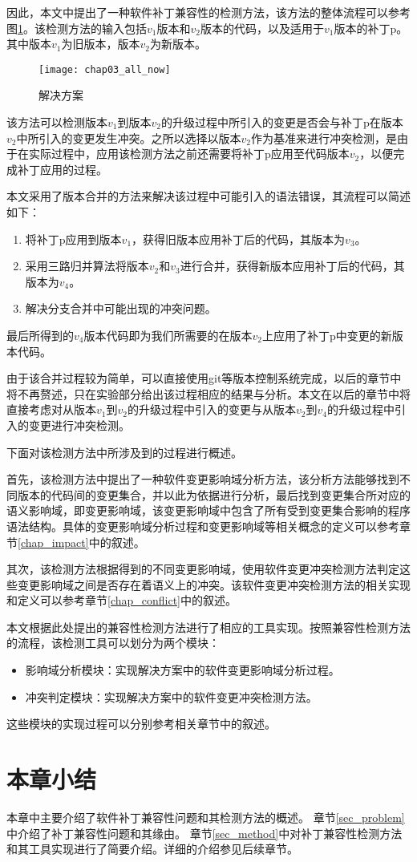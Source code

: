 因此，本文中提出了一种软件补丁兼容性的检测方法，该方法的整体流程可以参考图\ref {all_flow}。该检测方法的输入包括$v_1$版本和$v_2$版本的代码，以及适用于$v_1$版本的补丁p。其中版本$v_1$为旧版本，版本$v_2$为新版本。

\begin{figure}[H]
	\centering
	\texttt{[image: chap03\_all\_now]}
	\caption {解决方案}
	\label {all_flow}	
\end{figure}

该方法可以检测版本$v_1$到版本$v_2$的升级过程中所引入的变更是否会与补丁p在版本$v_2$中所引入的变更发生冲突。之所以选择以版本$v_2$作为基准来进行冲突检测，是由于在实际过程中，应用该检测方法之前还需要将补丁p应用至代码版本$v_2$，以便完成补丁应用的过程。

本文采用了版本合并的方法来解决该过程中可能引入的语法错误，其流程可以简述如下：
\begin{enumerate}
	\item 将补丁p应用到版本$v_1$，获得旧版本应用补丁后的代码，其版本为$v_3$。
	\item 采用三路归并算法将版本$v_2$和$v_3$进行合并，获得新版本应用补丁后的代码，其版本为$v_4$。
	\item 解决分支合并中可能出现的冲突问题。
\end{enumerate}

最后所得到的$v_4$版本代码即为我们所需要的在版本$v_2$上应用了补丁p中变更的新版本代码。

由于该合并过程较为简单，可以直接使用git等版本控制系统完成，以后的章节中将不再赘述，只在实验部分给出该过程相应的结果与分析。本文在以后的章节中将直接考虑对从版本$v_1$到$v_2$的升级过程中引入的变更与从版本$v_2$到$v_4$的升级过程中引入的变更进行冲突检测。

下面对该检测方法中所涉及到的过程进行概述。

首先，该检测方法中提出了一种软件变更影响域分析方法，该分析方法能够找到不同版本的代码间的变更集合，并以此为依据进行分析，最后找到变更集合所对应的语义影响域，即变更影响域，该变更影响域中包含了所有受到变更集合影响的程序语法结构。具体的变更影响域分析过程和变更影响域等相关概念的定义可以参考章节\ref {chap_impact}中的叙述。

其次，该检测方法根据得到的不同变更影响域，使用软件变更冲突检测方法判定这些变更影响域之间是否存在着语义上的冲突。该软件变更冲突检测方法的相关实现和定义可以参考章节\ref {chap_conflict}中的叙述。

本文根据此处提出的兼容性检测方法进行了相应的工具实现。按照兼容性检测方法的流程，该检测工具可以划分为两个模块：
\begin{itemize}
	\item 影响域分析模块：实现解决方案中的软件变更影响域分析过程。
	\item 冲突判定模块：实现解决方案中的软件变更冲突检测方法。
\end{itemize}

这些模块的实现过程可以分别参考相关章节中的叙述。

\section{本章小结}
本章中主要介绍了软件补丁兼容性问题和其检测方法的概述。
章节\ref {sec_problem}中介绍了补丁兼容性问题和其缘由。
章节\ref {sec_method}中对补丁兼容性检测方法和其工具实现进行了简要介绍。详细的介绍参见后续章节。


